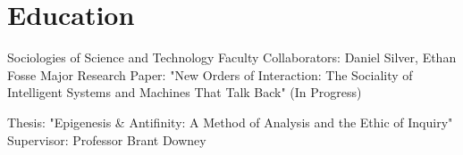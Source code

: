 \section{Education}

    Sociologies of Science and Technology
    Faculty Collaborators: Daniel Silver, Ethan Fosse
    Major Research Paper: "New Orders of Interaction: The Sociality of Intelligent Systems and Machines That Talk Back" (In Progress)

    Thesis: "Epigenesis & Antifinity: A Method of Analysis and the Ethic of Inquiry"
    Supervisor: Professor Brant Downey

